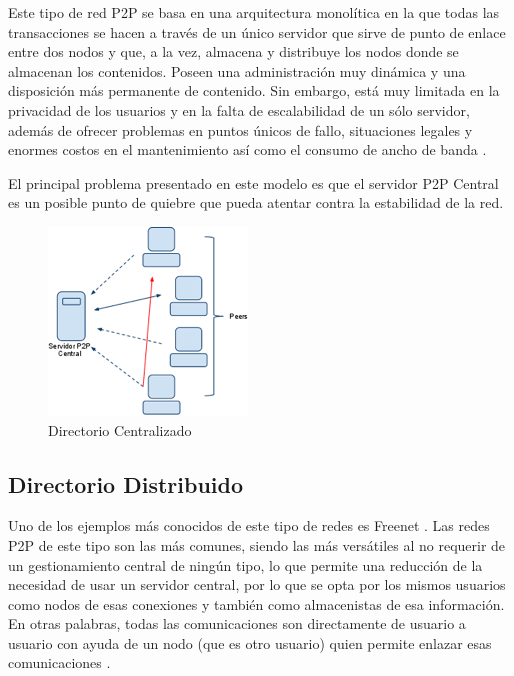 Este tipo de red P2P se basa en una arquitectura monolítica en la que todas las transacciones se hacen a través de un único servidor que sirve de punto de enlace entre dos nodos y que, a la vez, almacena y distribuye los nodos donde se almacenan los contenidos. Poseen una administración muy dinámica y una disposición más permanente de contenido. Sin embargo, está muy limitada en la privacidad de los usuarios y en la falta de escalabilidad de un sólo servidor, además de ofrecer problemas en puntos únicos de fallo, situaciones legales y enormes costos en el mantenimiento así como el consumo de ancho de banda \cite{wiki_p2p}.

El principal problema presentado en este modelo es que el servidor P2P Central es un posible punto de quiebre que pueda atentar contra la estabilidad de la red.

\begin{figure}[h]
  \centering
    \includegraphics[scale=1]{gfx/p2p_central}
  \caption{Directorio Centralizado}
  \label{p2p_central}
\end{figure}


\subsection{Directorio Distribuido}

Uno de los ejemplos más conocidos de este tipo de redes es Freenet \cite{rfc4981}. Las redes P2P de este tipo son las más comunes, siendo las más versátiles al no requerir de un gestionamiento central de ningún tipo, lo que permite una reducción de la necesidad de usar un servidor central, por lo que se opta por los mismos usuarios como nodos de esas conexiones y también como almacenistas de esa información. En otras palabras, todas las comunicaciones son directamente de usuario a usuario con ayuda de un nodo (que es otro usuario) quien permite enlazar esas comunicaciones \cite{wiki_p2p}.

